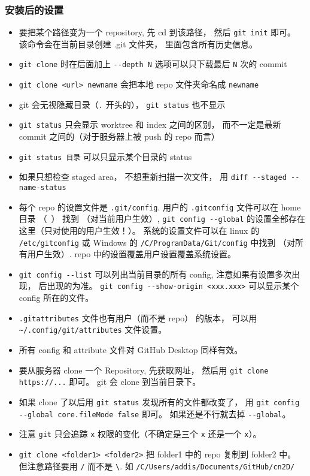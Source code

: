 \subsubsection{安装后的设置}
\begin{itemize}
\item 要把某个路径变为一个 repository, 先 cd 到该路径， 然后 \verb`git init` 即可。 该命令会在当前目录创建 .git 文件夹， 里面包含所有历史信息。
\item \verb`git clone` 时在后面加上 \verb`--depth N` 选项可以只下载最后 \verb`N` 次的 commit
\item \verb`git clone <url> newname` 会把本地 repo 文件夹命名成 \verb`newname`
\item git 会无视隐藏目录（\verb`.` 开头的）， \verb`git status` 也不显示
\item \verb`git status` 只会显示 worktree 和 index 之间的区别， 而不一定是最新 commit 之间的（对于服务器上被 push 的 repo 而言）
\item \verb`git status 目录` 可以只显示某个目录的 status
\item 如果只想检查 staged area， 不想重新扫描一次文件， 用 \verb`diff --staged --name-status`
\item 每个 repo 的设置文件是 \verb`.git/config`. 用户的 \verb`.gitconfig` 文件可以在 home 目录 （~） 找到 （对当前用户生效）, \verb`git config --global` 的设置全部存在这里（只对使用的用户生效！）。 系统的设置文件可以在 linux 的 \verb`/etc/gitconfig` 或 Windows 的 \verb`/C/ProgramData/Git/config` 中找到 （对所有用户生效）. repo 中的设置覆盖用户设置覆盖系统设置。
\item \verb`git config --list` 可以列出当前目录的所有 config, 注意如果有设置多次出现， 后出现的为准。 \verb`git config --show-origin <xxx.xxx>` 可以显示某个 config 所在的文件。
\item \verb`.gitattributes` 文件也有用户（而不是 repo） 的版本， 可以用 \verb`~/.config/git/attributes` 文件设置。
\item 所有 config 和 attribute 文件对 GitHub Desktop 同样有效。
\item 要从服务器 clone 一个 Repository, 先获取网址， 然后用 \verb`git clone https://...` 即可。 git 会 clone 到当前目录下。
\item 如果 clone 了以后用 \verb`git status` 发现所有的文件都改变了， 用 \verb`git config --global core.fileMode false` 即可。 如果还是不行就去掉 \verb`--global`。
\item 注意 \verb`git` 只会追踪 \verb`x` 权限的变化（不确定是三个 \verb`x` 还是一个 \verb`x`）。
\item \verb`git clone <folder1> <folder2>` 把 folder1 中的 repo 复制到 folder2 中。 但注意路径要用 \verb`/` 而不是 \verb`\`. 如 \verb`/C/Users/addis/Documents/GitHub/cn2D/`

\end{itemize}
